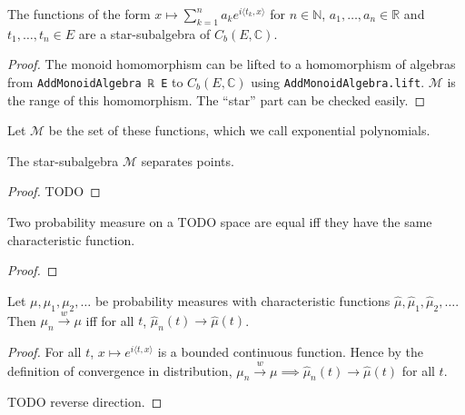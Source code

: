 \begin{lemma}\label{lem:starSubalgebra_expPoly}
The functions of the form $x \mapsto \sum_{k=1}^n a_k e^{i\langle t_k, x\rangle}$ for $n \in \mathbb{N}$, $a_1, \ldots, a_n \in \mathbb{R}$ and $t_1, \ldots, t_n \in E$ are a star-subalgebra of $C_b(E, \mathbb{C})$. 
\end{lemma}

\begin{proof}
The monoid homomorphism can be lifted to a homomorphism of algebras from \texttt{AddMonoidAlgebra ℝ E} to $C_b(E, \mathbb{C})$ using \texttt{AddMonoidAlgebra.lift}. $\mathcal M$ is the range of this homomorphism. The ``star'' part can be checked easily.
\end{proof}

Let $\mathcal M$ be the set of these functions, which we call exponential polynomials.

\begin{lemma}\label{lem:separating_expPoly}
The star-subalgebra $\mathcal M$ separates points.
\end{lemma}

\begin{proof}
TODO
\end{proof}


\begin{lemma}\label{lem:ext_charFun}
Two probability measure on a TODO space are equal iff they have the same characteristic function.
\end{lemma}
\begin{proof}

\end{proof}

\begin{theorem}\label{thm:charFun_tendsto_iff_measure_tendsto}
Let $\mu, \mu_1, \mu_2, \ldots$ be probability measures with characteristic functions $\hat{\mu}, \hat{\mu}_1, \hat{\mu}_2, \ldots$. Then $\mu_n \xrightarrow{w} \mu$ iff for all $t$, $\hat{\mu}_n(t) \to \hat{\mu}(t)$.
\end{theorem}

\begin{proof}
For all $t$, $x \mapsto e^{i \langle t, x \rangle}$ is a bounded continuous function. Hence by the definition of convergence in distribution, $\mu_n \xrightarrow{w} \mu \implies \hat{\mu}_n(t) \to \hat{\mu}(t)$ for all $t$.

TODO reverse direction.
\end{proof}